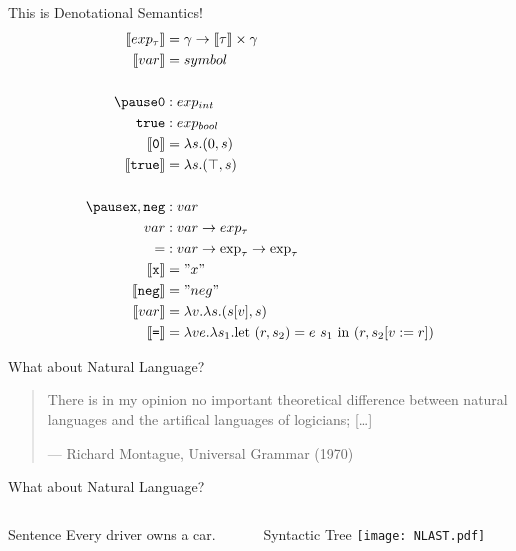 \documentclass{beamer}
\newcommand{\sem}[1]{\llbracket #1 \rrbracket}
\begin{document}
\begin{frame}{This is Denotational Semantics!}
\vspace{-7mm}
\begin{align*}
\sem{exp_{\tau}} &= \gamma \to \sem{\tau} \times \gamma \\
\sem{var} &= symbol \\
\\ \pause
\texttt{0} &: exp_{int} \\
\texttt{true} &: exp_{bool} \\
\sem{\texttt{0}} &= \lambda s. (0, s)  \\
\sem{\texttt{true}} &= \lambda s. (\top, s) \\
\\ \pause
\texttt{x}, \texttt{neg} &: var \\
var &: var \to exp_{\tau} \\
= &: var \to \exp_{\tau} \to \exp_{\tau} \\
\sem{\texttt{x}} &= "x" \\
\sem{\texttt{neg}} &= "neg" \\
\sem{var} &= \lambda v. \lambda s. (s[v], s) \\
\sem{\texttt{=}} &= \lambda v e. \lambda s_1. \text{let}\ (r, s_2) = e\ s_1\ \text{in}\ (r, s_2[v := r])
\end{align*}
\end{frame}

\begin{frame}{What about Natural Language?}
\begin{center}
\begin{quotation}
  There is in my opinion no important theoretical difference between
  natural languages and the artifical languages of logicians; [\ldots]

  \raggedleft--- \textup{Richard Montague}, Universal Grammar (1970)
\end{quotation}
\end{center}
\end{frame}

\begin{frame}{What about Natural Language?}
\begin{columns}
\begin{column}{0.5\textwidth}
\begin{block}{Sentence}
  Every driver owns a car.
\end{block}
\end{column}
\begin{column}{0.5\textwidth}
  \begin{block}{Syntactic Tree}
  \texttt{[image: NLAST.pdf]}
  \end{block}
\end{column}
\end{columns}
\end{frame}
\end{document}
